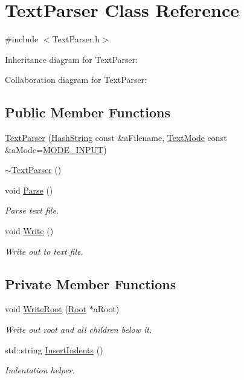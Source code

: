 \hypertarget{classTextParser}{}\section{Text\+Parser Class Reference}
\label{classTextParser}


{\ttfamily \#include $<$Text\+Parser.\+h$>$}



Inheritance diagram for Text\+Parser\+:


Collaboration diagram for Text\+Parser\+:
\subsection*{Public Member Functions}
\begin{DoxyCompactItemize}
\item 
\hyperlink{classTextParser_a9978373f77f9a5ba676158999d57c1ed}{Text\+Parser} (\hyperlink{classHashString}{Hash\+String} const \&a\+Filename, \hyperlink{TextParser_8h_a55362bc0aeda7fca6f18d4be3d0d1c06}{Text\+Mode} const \&a\+Mode=\hyperlink{TextParser_8h_a55362bc0aeda7fca6f18d4be3d0d1c06a4f139294c29235db806091c9383a3ba1}{M\+O\+D\+E\+\_\+\+I\+N\+P\+UT})
\item 
\hyperlink{classTextParser_ae1b0a1ef43e3bcf731a179ad48738643}{$\sim$\+Text\+Parser} ()
\item 
void \hyperlink{classTextParser_a0e46d85aa94313099411cef24c0fd164}{Parse} ()
\begin{DoxyCompactList}\small\item\em Parse text file. \end{DoxyCompactList}\item 
void \hyperlink{classTextParser_a3565eef49bd6e0a41910a1f115e04ed4}{Write} ()
\begin{DoxyCompactList}\small\item\em Write out to text file. \end{DoxyCompactList}\end{DoxyCompactItemize}
\subsection*{Private Member Functions}
\begin{DoxyCompactItemize}
\item 
void \hyperlink{classTextParser_ac246535a926ca63118b093ef21ae97ed}{Write\+Root} (\hyperlink{classRoot}{Root} $\ast$a\+Root)
\begin{DoxyCompactList}\small\item\em Write out root and all children below it. \end{DoxyCompactList}\item 
std\+::string \hyperlink{classTextParser_ad269ababd03345aa37c897a42caa408d}{Insert\+Indents} ()
\begin{DoxyCompactList}\small\item\em Indentation helper. \end{DoxyCompactList}\end{DoxyCompactItemize}
